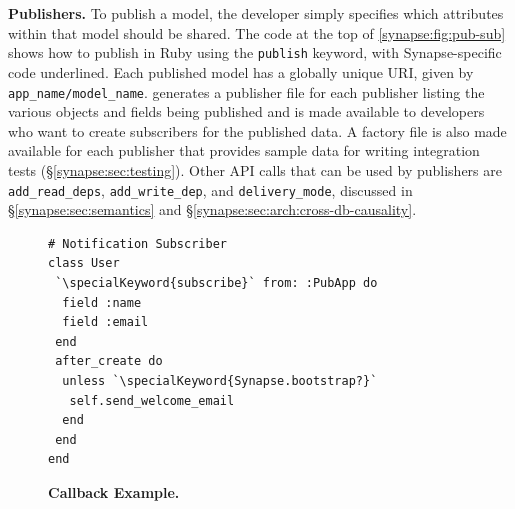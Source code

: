 {\bf Publishers.} 
To publish a model, the developer simply specifies which attributes within that
model should be shared.
The code at the top of
\F\ref{synapse:fig:pub-sub} shows how to publish
in Ruby using the {\tt publish} keyword, with Synapse-specific code
underlined.  
Each published model has a globally unique URI, given by {\tt
app\_name/model\_name}.  \synapse generates a publisher file for each
publisher listing the various objects and fields being published and is made
available to developers who want to create subscribers for the published data.
A factory file is also made available for each publisher that provides sample
data for writing integration tests (\S\ref{synapse:sec:testing}). 
Other API calls that
can be used by publishers are {\tt add\_read\_deps}, {\tt add\_write\_dep},
and {\tt delivery\_mode}, discussed in
\S\ref{synapse:sec:semantics} and \S\ref{synapse:sec:arch:cross-db-causality}.

\begin{figure}
\centering
\begin{minipage}{.4\textwidth}
  \begin{rbox}
\begin{lstlisting}
# Notification Subscriber
class User
 `\specialKeyword{subscribe}` from: :PubApp do
  field :name
  field :email
 end
 after_create do
  unless `\specialKeyword{Synapse.bootstrap?}`
   self.send_welcome_email
  end
 end
end
\end{lstlisting}
  \end{rbox}
\end{minipage}
\caption{{\bf Callback Example.}}
\label{synapse:fig:welcome-email}
\end{figure}

